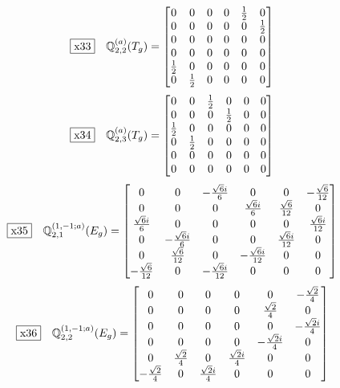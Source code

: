 \documentclass[fleqn,10pt,landscape]{jsarticle}
\begin{document}
\begin{dmath*}
\fbox{x33}\quad \mathbb{Q}_{2,2}^{(a)}(T_{g})=\begin{bmatrix} 0 & 0 & 0 & 0 & \frac{1}{2} & 0 \\ 0 & 0 & 0 & 0 & 0 & \frac{1}{2} \\ 0 & 0 & 0 & 0 & 0 & 0 \\ 0 & 0 & 0 & 0 & 0 & 0 \\ \frac{1}{2} & 0 & 0 & 0 & 0 & 0 \\ 0 & \frac{1}{2} & 0 & 0 & 0 & 0 \end{bmatrix}
\end{dmath*}
\begin{dmath*}
\fbox{x34}\quad \mathbb{Q}_{2,3}^{(a)}(T_{g})=\begin{bmatrix} 0 & 0 & \frac{1}{2} & 0 & 0 & 0 \\ 0 & 0 & 0 & \frac{1}{2} & 0 & 0 \\ \frac{1}{2} & 0 & 0 & 0 & 0 & 0 \\ 0 & \frac{1}{2} & 0 & 0 & 0 & 0 \\ 0 & 0 & 0 & 0 & 0 & 0 \\ 0 & 0 & 0 & 0 & 0 & 0 \end{bmatrix}
\end{dmath*}
\begin{dmath*}
\fbox{x35}\quad \mathbb{Q}_{2,1}^{(1,-1;a)}(E_{g})=\begin{bmatrix} 0 & 0 & - \frac{\sqrt{6} i}{6} & 0 & 0 & - \frac{\sqrt{6}}{12} \\ 0 & 0 & 0 & \frac{\sqrt{6} i}{6} & \frac{\sqrt{6}}{12} & 0 \\ \frac{\sqrt{6} i}{6} & 0 & 0 & 0 & 0 & \frac{\sqrt{6} i}{12} \\ 0 & - \frac{\sqrt{6} i}{6} & 0 & 0 & \frac{\sqrt{6} i}{12} & 0 \\ 0 & \frac{\sqrt{6}}{12} & 0 & - \frac{\sqrt{6} i}{12} & 0 & 0 \\ - \frac{\sqrt{6}}{12} & 0 & - \frac{\sqrt{6} i}{12} & 0 & 0 & 0 \end{bmatrix}
\end{dmath*}
\begin{dmath*}
\fbox{x36}\quad \mathbb{Q}_{2,2}^{(1,-1;a)}(E_{g})=\begin{bmatrix} 0 & 0 & 0 & 0 & 0 & - \frac{\sqrt{2}}{4} \\ 0 & 0 & 0 & 0 & \frac{\sqrt{2}}{4} & 0 \\ 0 & 0 & 0 & 0 & 0 & - \frac{\sqrt{2} i}{4} \\ 0 & 0 & 0 & 0 & - \frac{\sqrt{2} i}{4} & 0 \\ 0 & \frac{\sqrt{2}}{4} & 0 & \frac{\sqrt{2} i}{4} & 0 & 0 \\ - \frac{\sqrt{2}}{4} & 0 & \frac{\sqrt{2} i}{4} & 0 & 0 & 0 \end{bmatrix}
\end{dmath*}
\end{document}
